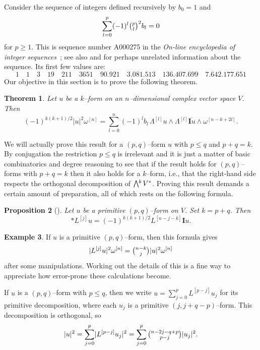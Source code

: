 \documentclass[11pt,a4paper]{amsart}
\def\^#1{^{[#1]}}
\def\bw#1{\bigwedge{}^{\mkern-5mu #1}\mkern2mu}
\def\I{\mathbf{I}}
\newtheorem{theo}{Theorem}[section]
\newtheorem{prop}[theo]{Proposition}
\theoremstyle{definition}
\newtheorem{exam}[theo]{Example}
\theoremstyle{remark}
\numberwithin{equation}{section}
\begin{document}
Consider the sequence of integers defined recursively by $b_0 = 1$ and
\begin{equation}
\label{bezel}
\sum_{l=0}^{p} (-1)^{l} \tbinom{p}{l}^2 b_l = 0
\end{equation}
for $p \geq 1$. This is sequence number A000275 in the \textsl{On-line
encyclopedia of integer sequences}~\cite{OEIS}; see also \cite{Carlitz}
and \cite{Riordan} for perhaps unrelated information about the sequence.
Its first few values are: 
$$
1 \quad 1 \quad 3 \quad 19 \quad 211 \quad 3651 \quad
90.921 \quad 3.081.513 \quad 136.407.699 \quad 7.642.177.651
$$
Our objective in this section is to prove the following theorem.


\begin{theo}
    \label{thm:norm}
Let $u$ be a $k$--form on an $n$--dimensional complex vector
space $V$. Then
$$
    (-1)^{k(k+1)/2}
    \lvert u \rvert^2 \omega\^n
    = \sum_{l=0}^n (-1)^{l} b_l \, 
    \Lambda\^l u \wedge \Lambda\^l \overline{\I u}
    \wedge \omega\^{n-k+2l}.
$$
\end{theo}

We will actually prove this result for a $(p,q)$--form $u$ with $p \leq q$
and $p+q = k$. By conjugation the restriction $p \leq q$ is irrelevant and
it is just a matter of basic combinatorics and degree reasoning to see
that if the result holds for $(p,q)$--forms with $p + q = k$ then it also
holds for a $k$--form, i.e., that the right-hand side respects the
orthogonal decomposition of $\bw{k}V^*$.  Proving this result demands a
certain amount of preparation, all of which rests on the following formula.


\begin{prop}[{{\cite[Proposition~1.67]{Huy}}}]
Let $u$ be a primitive $(p,q)$--form on $V$. Set $k = p+q$. Then
$$
    * L\^{j} u = (-1)^{k(k+1)/2} L\^{n-j-k} \I u.
$$
\end{prop}


\begin{exam}
If $u$ is a primitive $(p,q)$--form, then this formula gives
$$
\lvert L\^{j} u \rvert^2 \omega\^{n}
= \tbinom{n-k}{j} \lvert u \rvert^2 \omega\^{n}
$$
after some manipulations. Working out the details of this is a fine way to
appreciate how error-prone these calculations become.
\end{exam}


If $u$ is a $(p,q)$--form with $p \leq q$, then we write $u =
\sum_{j=0}^p L\^{p-j} u_j$ for its primitive decomposition, where each
$u_j$ is a primitive $(j,j+q-p)$--form. This decomposition is
orthogonal, so
$$
\lvert u \rvert^2
= \sum_{j=0}^p \lvert L\^{p-j} u_j \rvert^2
= \sum_{j=0}^p \tbinom{n-2j-q+p}{p-j} \lvert u_j \rvert^2.
$$
\end{document}
